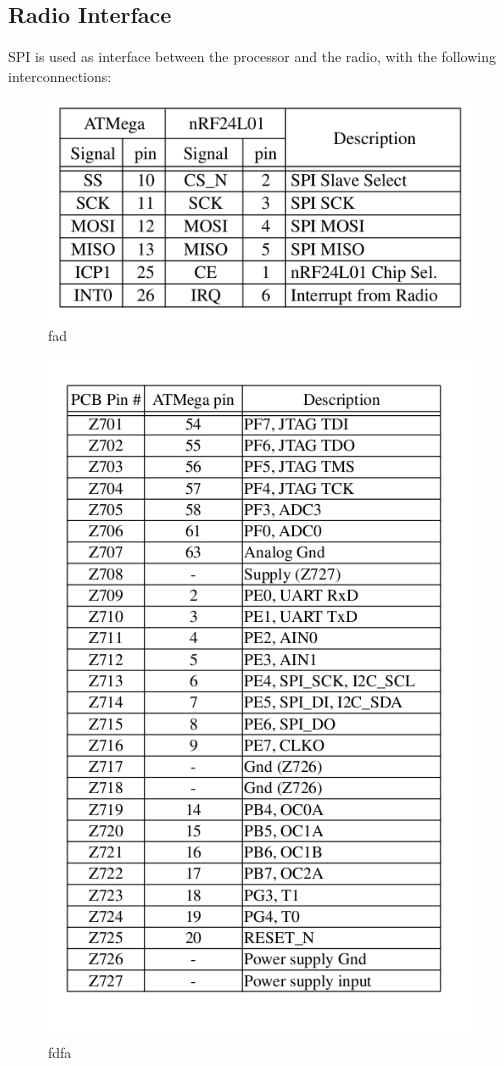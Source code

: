 \documentclass[a4paper,11pt]{report}
\begin{document}
\subsection{Radio Interface}
SPI is used as interface between the processor and the radio, with the following interconnections:
\begin{figure}[!h]
 \centering
 \includegraphics[width = 0.7 \textwidth] {table1}
 \caption{fad}
 \label{table1}
\end{figure}
\newline
\begin{figure}[!h]
 \centering
 \includegraphics[width = 0.7 \textwidth] {table2}
 \caption{fdfa}
 \label{table2}
\end{figure}
\end{document}
